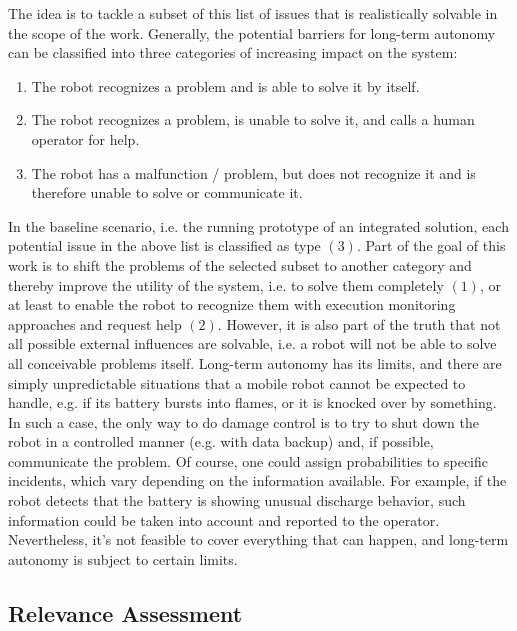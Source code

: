 \documentclass[english, master, utf8]{base/thesis_KBS}
\begin{document}
\noindent
The idea is to tackle a subset of this list of issues that is realistically solvable in the scope of the work.
Generally, the potential barriers for long-term autonomy can be classified into three categories of increasing impact on the system:
\begin{enumerate}
    \item The robot recognizes a problem and is able to solve it by itself.
    \item The robot recognizes a problem, is unable to solve it, and calls a human operator for help.
    \item The robot has a malfunction / problem, but does not recognize it and is therefore unable to solve or communicate it.
\end{enumerate}
In the baseline scenario, i.e. the running prototype of an integrated solution, each potential issue in the above list is classified as type $(3)$.
Part of the goal of this work is to shift the problems of the selected subset to another category and thereby improve the utility of the system, 
i.e. to solve them completely $(1)$, or at least to enable the robot to recognize them with execution monitoring approaches and request help $(2)$.
However, it is also part of the truth that not all possible external influences are solvable, i.e. a robot will not be able to solve all
conceivable problems itself. Long-term autonomy has its limits, and there are simply unpredictable situations that a mobile robot cannot be expected to handle,
e.g. if its battery bursts into flames, or it is knocked over by something. In such a case, the only way to do damage control is to try to shut down the 
robot in a controlled manner (e.g. with data backup) and, if possible, communicate the problem.
Of course, one could assign probabilities to specific incidents, which vary depending on the information available. 
For example, if the robot detects that the battery is showing unusual discharge behavior, such information could be taken into account and 
reported to the operator. Nevertheless, it's not feasible to cover everything that can happen, and long-term autonomy is subject to certain limits.

\subsection{Relevance Assessment}
\label{sec:relevance_assessment}
\end{document}
